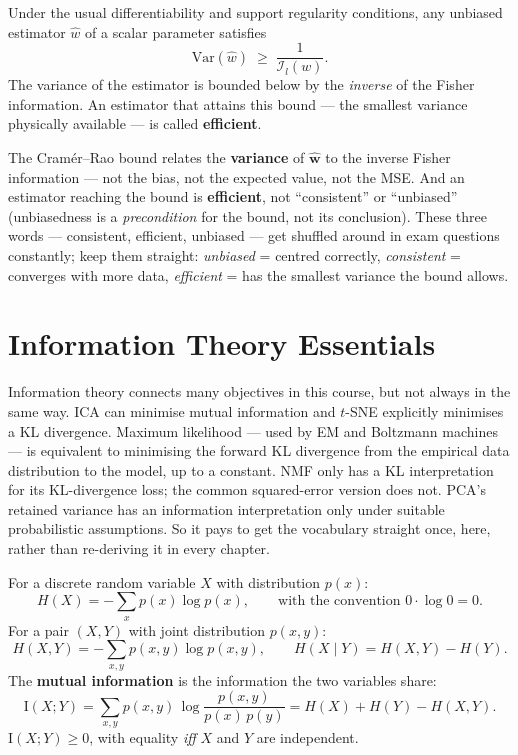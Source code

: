 \documentclass[11pt, oneside]{book}
\newcommand{\Var}{\mathrm{Var}}
\newcommand{\MI}{\mathrm{I}}
\newcommand{\what}{\hat{\bm{w}}}
\begin{document}
\begin{thmbox}[title={Cram\'{e}r--Rao Lower Bound}]
Under the usual differentiability and support regularity conditions, any unbiased
estimator $\hat w$ of a scalar parameter satisfies
\[
  \Var(\hat w) \;\geq\; \frac{1}{\mathcal{I}_l(w)}.
\]
The variance of the estimator is bounded below by the \emph{inverse} of the
Fisher information.
An estimator that attains this bound --- the smallest variance physically
available --- is called \textbf{efficient}.
\end{thmbox}

\begin{notebox}[title={Exam trap: which quantity does Cram\'{e}r--Rao bound?}]
The Cram\'{e}r--Rao bound relates the \textbf{variance} of $\what$ to the inverse
Fisher information --- not the bias, not the expected value, not the MSE.
And an estimator reaching the bound is \textbf{efficient}, not ``consistent''
or ``unbiased'' (unbiasedness is a \emph{precondition} for the bound, not its
conclusion).
These three words --- consistent, efficient, unbiased --- get shuffled around in
exam questions constantly; keep them straight:
\emph{unbiased} = centred correctly,
\emph{consistent} = converges with more data,
\emph{efficient} = has the smallest variance the bound allows.
\end{notebox}


\section{Information Theory Essentials}
\label{sec:info-theory}

Information theory connects many objectives in this course, but not always in the same
way. ICA can minimise mutual information and $t$-SNE explicitly minimises a KL
divergence. Maximum likelihood --- used by EM and Boltzmann machines --- is equivalent
to minimising the forward KL divergence from the empirical data distribution to the
model, up to a constant. NMF only has a KL interpretation for its KL-divergence loss;
the common squared-error version does not. PCA's retained variance has an information
interpretation only under suitable probabilistic assumptions.
So it pays to get the vocabulary straight once, here, rather than re-deriving it
in every chapter.

\begin{defbox}[title={Entropy, Joint \& Conditional Entropy, Mutual Information}]
For a discrete random variable $X$ with distribution $p(x)$:
\[
  H(X) = -\sum_{x} p(x)\log p(x),
  \qquad\text{with the convention } 0\cdot\log 0 = 0.
\]
For a pair $(X,Y)$ with joint distribution $p(x,y)$:
\[
  H(X,Y) = -\sum_{x,y} p(x,y)\log p(x,y),
  \qquad
  H(X\mid Y) = H(X,Y) - H(Y).
\]
The \textbf{mutual information} is the information the two variables share:
\[
  \MI(X;Y)
  = \sum_{x,y} p(x,y)\,\log\frac{p(x,y)}{p(x)\,p(y)}
  = H(X) + H(Y) - H(X,Y).
\]
$\MI(X;Y)\geq 0$, with equality \emph{iff} $X$ and $Y$ are independent.
\end{defbox}
\end{document}
